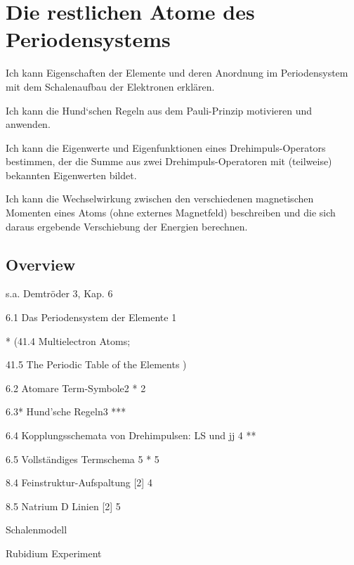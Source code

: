\renewcommand{\lastmod}{10. November 2024}
\renewcommand{\chapterauthors}{Markus Lippitz}

\chapter{Die restlichen Atome des Periodensystems}




Ich kann Eigenschaften der Elemente und deren Anordnung im Periodensystem mit dem Schalenaufbau der Elektronen erklären. 

Ich kann die Hund‘schen Regeln aus dem Pauli-Prinzip motivieren und anwenden.

Ich kann die Eigenwerte und Eigenfunktionen eines Drehimpuls-Operators bestimmen, der die Summe aus zwei Drehimpuls-Operatoren mit (teilweise) bekannten Eigenwerten bildet.

Ich kann die Wechselwirkung zwischen den verschiedenen magnetischen Momenten eines Atoms (ohne externes Magnetfeld) beschreiben und die sich daraus ergebende Verschiebung der Energien berechnen.



\section{Overview}

s.a. Demtröder 3, Kap. 6


6.1 Das Periodensystem der Elemente 1	

* (41.4 Multielectron Atoms; 

41.5 The Periodic Table of the Elements )

6.2 Atomare Term-Symbole2	*	2 

6.3* Hund’sche Regeln3	***

6.4 Kopplungsschemata von Drehimpulsen: LS und jj 4	**

6.5 Vollständiges Termschema 5	*	5 

8.4 Feinstruktur-Aufspaltung [2] 4	

8.5 Natrium D Linien [2] 5

Schalenmodell

Rubidium Experiment




